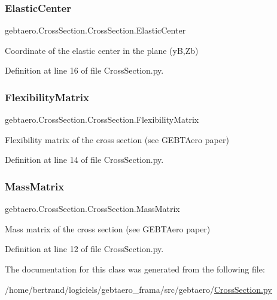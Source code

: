 \subsubsection{\texorpdfstring{Elastic\+Center}{ElasticCenter}}
{\footnotesize\ttfamily gebtaero.\+Cross\+Section.\+Cross\+Section.\+Elastic\+Center}



Coordinate of the elastic center in the plane (yB,Zb) 



Definition at line 16 of file Cross\+Section.\+py.

\mbox{\label{classgebtaero_1_1_cross_section_1_1_cross_section_ac20eafaf38ff757f9a8c9ae89212396a}} 
\subsubsection{\texorpdfstring{Flexibility\+Matrix}{FlexibilityMatrix}}
{\footnotesize\ttfamily gebtaero.\+Cross\+Section.\+Cross\+Section.\+Flexibility\+Matrix}



Flexibility matrix of the cross section (see G\+E\+B\+T\+Aero paper) 



Definition at line 14 of file Cross\+Section.\+py.

\mbox{\label{classgebtaero_1_1_cross_section_1_1_cross_section_ae9be8649853163b2b4dfdaa3584d9f78}} 
\subsubsection{\texorpdfstring{Mass\+Matrix}{MassMatrix}}
{\footnotesize\ttfamily gebtaero.\+Cross\+Section.\+Cross\+Section.\+Mass\+Matrix}



Mass matrix of the cross section (see G\+E\+B\+T\+Aero paper) 



Definition at line 12 of file Cross\+Section.\+py.



The documentation for this class was generated from the following file\+:\begin{DoxyCompactItemize}
\item 
/home/bertrand/logiciels/gebtaero\+\_\+frama/src/gebtaero/\hyperlink{_cross_section_8py}{Cross\+Section.\+py}\end{DoxyCompactItemize}
